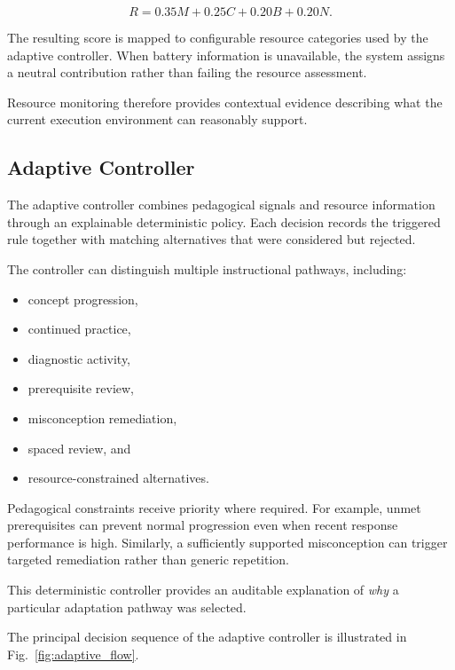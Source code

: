 \documentclass[conference]{IEEEtran}
\begin{document}
\begin{equation}
R = 0.35M + 0.25C + 0.20B + 0.20N.
\end{equation}

The resulting score is mapped to configurable resource categories used by the adaptive controller. When battery information is unavailable, the system assigns a neutral contribution rather than failing the resource assessment.

Resource monitoring therefore provides contextual evidence describing what the current execution environment can reasonably support.

\subsection{Adaptive Controller}

The adaptive controller combines pedagogical signals and resource information through an explainable deterministic policy. Each decision records the triggered rule together with matching alternatives that were considered but rejected.

The controller can distinguish multiple instructional pathways, including:

\begin{itemize}
    \item concept progression,
    \item continued practice,
    \item diagnostic activity,
    \item prerequisite review,
    \item misconception remediation,
    \item spaced review, and
    \item resource-constrained alternatives.
\end{itemize}

Pedagogical constraints receive priority where required. For example, unmet prerequisites can prevent normal progression even when recent response performance is high. Similarly, a sufficiently supported misconception can trigger targeted remediation rather than generic repetition.

This deterministic controller provides an auditable explanation of \textit{why} a particular adaptation pathway was selected.

The principal decision sequence of the adaptive controller is
illustrated in Fig.~\ref{fig:adaptive_flow}.
\end{document}

